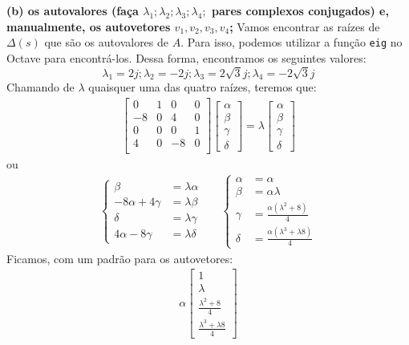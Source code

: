 \documentclass[11pt]{article}
\begin{document}
\textbf{(b) os autovalores (faça $\lambda_1; \lambda_2; \lambda_3; \lambda_4;$ pares complexos conjugados) e, manualmente, os autovetores $v_1, v_2, v_3, v_4$;}
Vamos encontrar as raízes de $\Delta(s)$ que são os autovalores de $A$. Para isso, podemos utilizar a função \texttt{eig} no Octave para encontrá-los. Dessa forma, encontramos os seguintes valores:
\[
  \lambda_1 = 2j; \lambda_2 = -2j; \lambda_3 = 2\sqrt{3}j; \lambda_4 = -2\sqrt{3}j
\]
Chamando de $\lambda$ quaisquer uma das quatro raízes, teremos que:
\begin{align*}
  \begin{bmatrix}
    0 & 1 & 0 & 0 \\
    -8 & 0 & 4 & 0 \\
    0 & 0 & 0 & 1 \\
    4 & 0 & -8 & 0 \\
  \end{bmatrix}
  \begin{bmatrix}
    \alpha\\
    \beta\\
    \gamma\\
    \delta
  \end{bmatrix}
  =
  \lambda
  \begin{bmatrix}
    \alpha\\
    \beta\\
    \gamma\\
    \delta
  \end{bmatrix}
\end{align*}
ou
\begin{align*}
  \begin{cases}
    \beta  &= \lambda \alpha\\
    -8\alpha + 4\gamma &= \lambda \beta\\
    \delta &= \lambda \gamma \\
    4\alpha - 8\gamma &= \lambda \delta
  \end{cases}
  &
  &
  \begin{cases}
    \alpha &= \alpha\\
    \beta  &= \alpha \lambda\\
    \gamma &= \frac{\alpha (\lambda^2 +8)}{4} \\
    \delta &= \frac{\alpha (\lambda^3 + \lambda 8)}{4}
  \end{cases}
\end{align*}
Ficamos, com um padrão para os autovetores:
\begin{align*}
  \alpha
  \begin{bmatrix}
    1\\
    \lambda\\
    \frac{\lambda^2 +8}{4} \\
    \frac{\lambda^3 +\lambda 8}{4}
  \end{bmatrix}
\end{align*}
\end{document}
